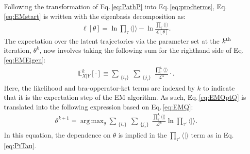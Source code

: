 \documentclass[journal=jpcbfk,manuscript=article,layout=twocolumn,articletitle=true]{achemso}
\DeclareMathOperator*{\argmax}{arg\,max}
\begin{document}
Following the transformation of Eq.\,\ref{eq:PathP} into Eq.\,\ref{eq:prodterms}, Eq.\,\ref{eq:EMstart} is written with the eigenbasis decomposition as:
\begin{align}
\label{eq:EMEigen}
\ell[\theta] = \ln {\prod}_{\tau} \langle |\rangle - \ln \frac{\prod_{\tau} \langle |\rangle}{\mathcal{L}[\theta]}.
\end{align}
The expectation over the latent trajectories via the parameter set at the $k^{\rm th}$ iteration, $\theta^k$, now involves taking the following sum for the righthand side of Eq.\,\ref{eq:EMEigen}:
\begin{align}
\mathbb{E}^k_{X|Y}[\cdot] \equiv \sum_{\substack{\{i_\tau\}}} \sum_{\substack{\{j_\tau\}}} \frac{\prod^k_{\tau} \langle |\rangle}{\mathcal{L}^k}\cdot.
\end{align}
Here, the likelihood and bra-opperator-ket terms are indexed by $k$ to indicate that it is the expectation step of the EM algorithm. As such, Eq.\,\ref{eq:EMOptQ} is translated into the following expression based on Eq.\,\ref{eq:EMQ}: 
\begin{align}
\label{eq:prodQ}
\theta^{k+1} = \argmax_{\theta} \sum_{\substack{\{i_\tau\}}} \sum_{\substack{\{j_\tau\}}} \frac{\prod^k_{\tau} \langle |\rangle}{\mathcal{L}^k} \ln {\prod}_{\tau'} \langle |\rangle.
\end{align}
In this equation, the dependence on $\theta$ is implied in the $\prod_{\tau'} \langle |\rangle$ term as in Eq.\,\ref{eq:PiTau}. 
\end{document}
